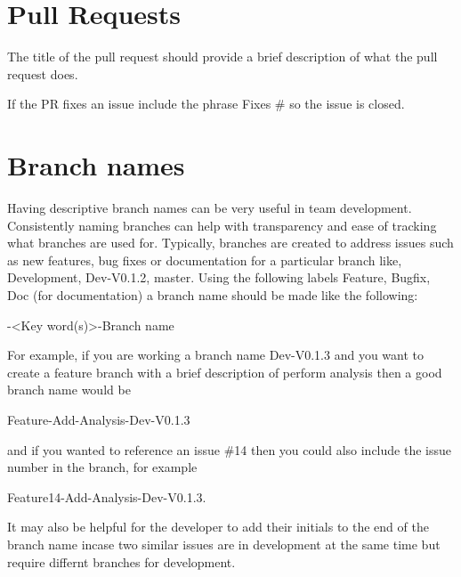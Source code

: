 \documentclass[
]{book}
\begin{document}
\hypertarget{pull-requests}{%
\section{Pull Requests}\label{pull-requests}}

The title of the pull request should provide a brief description of what the pull request does.

If the PR fixes an issue include the phrase Fixes \# so the issue is closed.

\hypertarget{branch-names}{%
\section{Branch names}\label{branch-names}}

Having descriptive branch names can be very useful in team development. Consistently naming branches can help with transparency and ease of tracking what branches are used for. Typically, branches are created to address issues such as new features, bug fixes or documentation for a particular branch like, Development, Dev-V0.1.2, master. Using the following labels Feature, Bugfix, Doc (for documentation) a branch name should be made like the following:

-\textless Key word(s)\textgreater-Branch name

For example, if you are working a branch name Dev-V0.1.3 and you want to create a feature branch with a brief description of perform analysis then a good branch name would be

Feature-Add-Analysis-Dev-V0.1.3

and if you wanted to reference an issue \#14 then you could also include the issue number in the branch, for example

Feature14-Add-Analysis-Dev-V0.1.3.

It may also be helpful for the developer to add their initials to the end of the branch name incase two similar issues are in development at the same time but require differnt branches for development.
\end{document}
